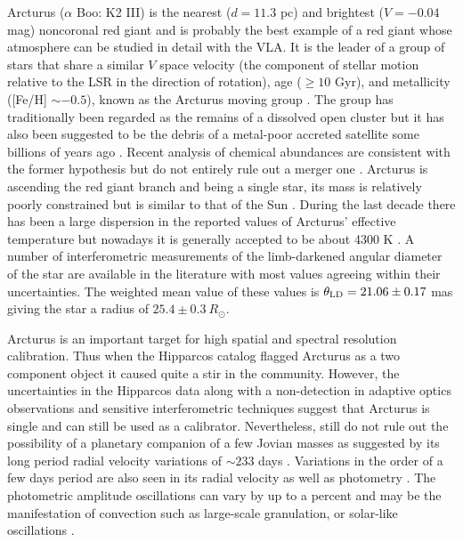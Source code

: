 Arcturus ($\alpha$ Boo: K2 III) is the nearest ($d=11.3$ pc) and brightest ($V=-0.04$ mag) noncoronal red giant and is probably the best example of a red giant whose atmosphere can be studied in detail with the VLA. It is the leader of a group of stars that share a similar $V$  space velocity (the component of stellar motion relative to the LSR in the direction of rotation),  age ($\geq10$ Gyr), and metallicity ([Fe/H] $\sim -0.5$), known as the Arcturus moving group \citep{eggen_1971}. The group has traditionally been regarded as the remains of a dissolved open cluster \citep[e.g.,][]{eggen_1971,eggen_1996} but it has also been suggested to be  the debris of a metal-poor accreted satellite some billions of years ago \citep{navarro_2004}. Recent analysis of chemical abundances are consistent with the former hypothesis but do not entirely rule out a merger one \citep{williams_2009}. Arcturus is ascending the red giant branch and being a single star, its mass is relatively poorly constrained but is similar to that of the Sun \citep[$0.8 \pm 0.2 \ M_{\odot}$ by][]{kallinger_2010}. During the last decade there has been a large dispersion in the reported values of Arcturus' effective temperature \citep[a nice graph summarizing this is presented in][]{griffin_1996} but nowadays it is generally accepted to be about 4300 K \citep{di_benedetto_1993}. A number of interferometric measurements of the limb-darkened angular diameter of the star are available in the literature with most values agreeing within their uncertainties. The weighted mean value of these values is $\theta _{\rm{LD}}= 21.06\pm0.17$ mas \citep{ramirez_2011} giving the star a radius of $25.4\pm 0.3\ R_{\odot}$.

Arcturus is an important target for high spatial and spectral resolution calibration. Thus when the Hipparcos catalog flagged Arcturus as a two component object \citep{perryman_1997} it caused quite a stir in the community. However, the uncertainties in the  Hipparcos data \citep{Soderhjelm_1998O} along with a non-detection in adaptive optics observations \citep{turner_1999} and sensitive interferometric techniques \citep{lacour_2008} suggest that Arcturus is single and can still be used as a calibrator. Nevertheless, \cite{lacour_2008} still do not rule out the possibility of a planetary companion of a few Jovian masses as suggested by its long period radial velocity variations of $\sim 233$ days \citep{hatzes_1993,brown_2007}. Variations in the order of a few days period are also seen in its radial velocity \citep{merline_1999} as well as photometry \citep{retter_2003}. The photometric amplitude oscillations can vary by up to a percent and may be the manifestation of convection such as large-scale granulation, or solar-like oscillations \citep{dziembowski_2001}. 

